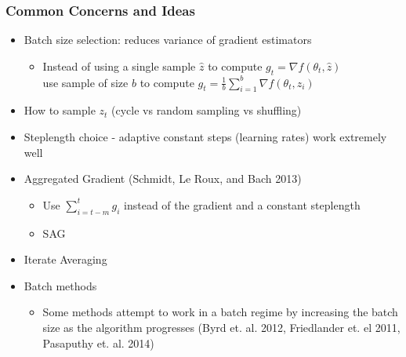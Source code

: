 \documentclass{beamer}
\begin{document}
\begin{frame}
	\frametitle{Common Concerns and Ideas}
	\begin{itemize}
		\pause
		\item Batch size selection: reduces variance of gradient estimators
		\begin{itemize}
			\item Instead of using a single sample $\hat{z}$ to compute $g_t=\nabla f(\theta_t,\hat{z})$ \\
			      use sample of size $b$ to compute $g_t=\frac{1}{b}\sum_{i=1}^b \nabla f(\theta_t,z_i)$
		\end{itemize}
		\pause
		\item How to sample $z_t$ (cycle vs random sampling vs shuffling) 
		\pause
		\item Steplength choice - adaptive constant steps (learning rates) work extremely well
		\pause
		\item Aggregated Gradient (Schmidt, Le Roux, and Bach 2013)
		\begin{itemize}
			\item Use $\sum_{i=t-m}^{t} g_i$ instead of the gradient and a constant steplength
			\item SAG 
		\end{itemize}
		\pause
		\item Iterate Averaging
		\pause
		\item Batch methods
		\begin{itemize}
			\item Some methods attempt to work in a batch regime by increasing the batch size as the algorithm progresses (Byrd et. al. 2012, Friedlander et. el 2011, Pasaputhy et. al. 2014)
		\end{itemize}
	\end{itemize}
\end{frame} 
\end{document}
